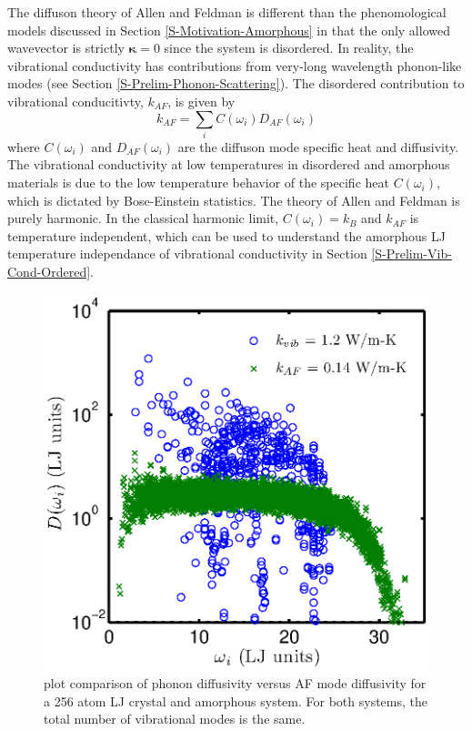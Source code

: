 \documentclass[letterpaper,12pt]{article}
\begin{document}
The diffuson theory of Allen and Feldman is different than the phenomological models discussed in Section \ref{S-Motivation-Amorphous} in that the only allowed wavevector is strictly $\mathbf{\kappa}= 0$ since the system is disordered. In reality, the vibrational conductivity has contributions from very-long wavelength phonon-like modes (see Section \ref{S-Prelim-Phonon-Scattering}). The disordered contribution to vibrational conducitivty, $k_{AF}$, is given by
\begin{equation}\label{EQ:M:k_AF}
k_{AF} = \sum_i C(\omega_i) D_{AF}(\omega_i)
\end{equation}
where $C(\omega_i)$  and $D_{AF}(\omega_i)$ are the diffuson mode specific heat and diffusivity. The vibrational conductivity at low temperatures in disordered and amorphous materials is due to the low temperature behavior of the specific heat $C(\omega_i)$, which is dictated by Bose-Einstein statistics.\cite{allen1993} The theory of Allen and Feldman is purely harmonic. In the classical harmonic limit, $C(\omega_i) = k_{B}$ and $k_{AF}$ is temperature independent, which can be used to understand the amorphous LJ temperature independance of vibrational conductivity in Section \ref{S-Prelim-Vib-Cond-Ordered}.

\begin{figure}
\begin{center}
\includegraphics[scale=0.6]{phonon_diff.eps}
\vspace*{-5mm}
\end{center}
\caption{\label{FIG:phonon_diff} plot comparison of phonon diffusivity versus AF mode diffusivity for a 256 atom LJ crystal and amorphous system. For both systems, the total number of vibrational modes is the same.}
\end{figure}
\end{document}
